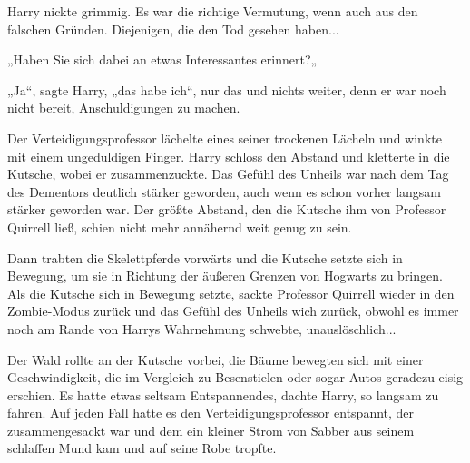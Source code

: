 {Harry nickte grimmig. Es war die richtige Vermutung, wenn auch aus den falschen Gründen. Diejenigen, die den Tod gesehen haben...

„Haben Sie sich dabei an etwas Interessantes erinnert?„

„Ja“, sagte Harry, „das habe ich“, nur das und nichts weiter, denn er war noch nicht bereit, Anschuldigungen zu machen.

Der Verteidigungsprofessor lächelte eines seiner trockenen Lächeln und winkte mit einem ungeduldigen Finger. Harry schloss den Abstand und kletterte in die Kutsche, wobei er zusammenzuckte. Das Gefühl des Unheils war nach dem Tag des Dementors deutlich stärker geworden, auch wenn es schon vorher langsam stärker geworden war. Der größte Abstand, den die Kutsche ihm von Professor Quirrell ließ, schien nicht mehr annähernd weit genug zu sein.

Dann trabten die Skelettpferde vorwärts und die Kutsche setzte sich in Bewegung, um sie in Richtung der äußeren Grenzen von Hogwarts zu bringen. Als die Kutsche sich in Bewegung setzte, sackte Professor Quirrell wieder in den Zombie-Modus zurück und das Gefühl des Unheils wich zurück, obwohl es immer noch am Rande von Harrys Wahrnehmung schwebte, unauslöschlich...

Der Wald rollte an der Kutsche vorbei, die Bäume bewegten sich mit einer Geschwindigkeit, die im Vergleich zu Besenstielen oder sogar Autos geradezu eisig erschien. Es hatte etwas seltsam Entspannendes, dachte Harry, so langsam zu fahren. Auf jeden Fall hatte es den Verteidigungsprofessor entspannt, der zusammengesackt war und dem ein kleiner Strom von Sabber aus seinem schlaffen Mund kam und auf seine Robe tropfte.

}
